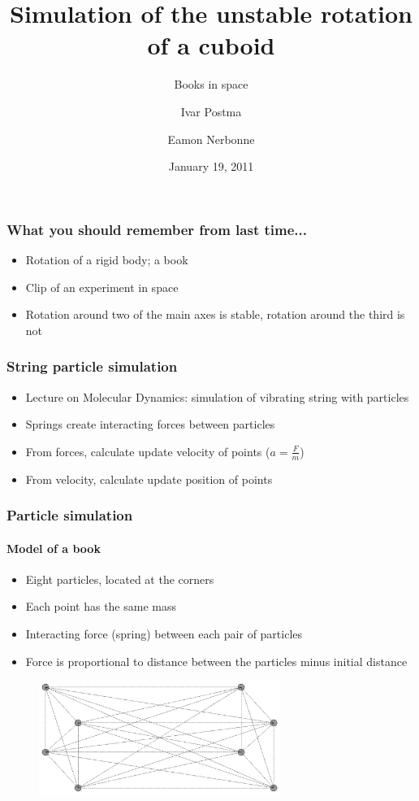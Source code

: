 \documentclass{beamer}
\title{Simulation of the unstable rotation of a cuboid}
\subtitle{Books in space}
\author{Ivar Postma \and Eamon Nerbonne}
\institute[University of Groningen]
{
  Introduction to Computational Science \\
  School for Computing and Cognition \\
  University of Groningen
}
\date{January 19, 2011}
\begin{document}
\frame{\titlepage}

\begin{frame}
 \frametitle{What you should remember from last time...}
 \begin{itemize}
  \item Rotation of a rigid body; a book
  \item Clip of an experiment in space
  \item Rotation around two of the main axes is stable, rotation around the third is not
 \end{itemize}
\end{frame}

\begin{frame}
 \frametitle{String particle simulation}
 \begin{itemize}
  \item Lecture on Molecular Dynamics: simulation of vibrating string with particles
  \item Springs create interacting forces between particles
  \item From forces, calculate update velocity of points ($a = \frac{F}{m}$)
  \item From velocity, calculate update position of points
 \end{itemize}
\end{frame}

\begin{frame}
 \frametitle{Particle simulation}
 \framesubtitle{Model of a book}
 \begin{itemize}
  \item Eight particles, located at the corners
  \item Each point has the same mass
  \item Interacting force (spring) between each pair of particles
  \item Force is proportional to distance between the particles minus initial distance
 \end{itemize}
 \pause
 \begin{figure}
  \centering
  \includegraphics[width=0.7\textwidth]{strings.pdf}
 \end{figure}
\end{frame}
\end{document}
